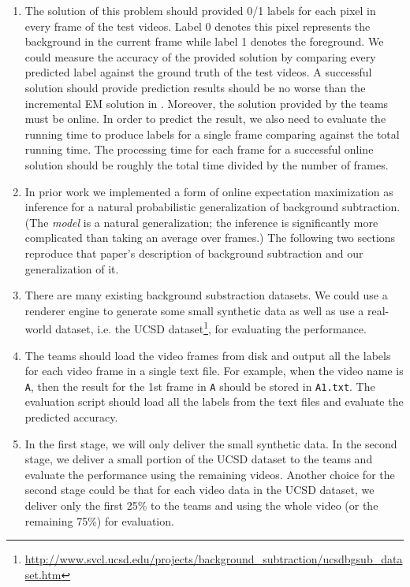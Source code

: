 \begin{enumerate}[i]
\item The solution of this problem should provided 0/1 labels for each pixel in every frame of the test videos. Label 0 denotes this pixel represents the background in the current frame while label 1 denotes the foreground. We could measure the accuracy of the provided solution by comparing every predicted label against the ground truth of the test videos. A successful solution should provide prediction results should be no worse than the incremental EM solution in \cite{friedman1997image}.
    Moreover, the solution provided by the teams must be online. In order to predict the result, we also need to evaluate the running time to produce labels for a single frame comparing against the total running time. The processing time for each frame for a successful online solution should be roughly the total time divided by the number of frames.
\item In prior work we implemented a form of online expectation
  maximization as inference for a natural probabilistic
  generalization of background subtraction\cite{friedman1997image}.
  (The \emph{model} is a natural 
  generalization; the inference is significantly more
  complicated than taking an average over frames.)  The following two sections
  reproduce that paper's description of background subtraction and our
  generalization of it.
\item There are many existing background substraction datasets. We could use a renderer engine to generate some small synthetic data as well as use a real-world dataset, i.e. the UCSD dataset\footnote{\url{http://www.svcl.ucsd.edu/projects/background_subtraction/ucsdbgsub_dataset.htm}}, for evaluating the performance.
\item The teams should load the video frames from disk and output all the labels for each video frame in a single text file. For example, when the video name is \texttt{A}, then the result for the 1st frame in \texttt{A} should be stored in \texttt{A1.txt}. The evaluation script should load all the labels from the text files and evaluate the predicted accuracy.
\item In the first stage, we will only deliver the small synthetic data. In the second stage, we deliver a small portion of the UCSD dataset to the teams and evaluate the performance using the remaining videos. Another choice for the second stage could be that for each video data in the UCSD dataset, we deliver only the first 25\% to the teams and using the whole video (or the remaining 75\%) for evaluation.
\end{enumerate}


